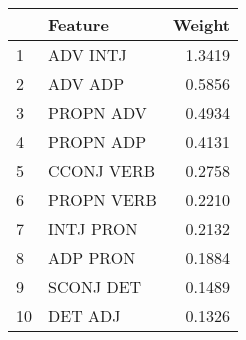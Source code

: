 \begin{tabular}{llr}
\toprule
{} &     Feature &  Weight \\
\midrule
1  &    ADV INTJ &  1.3419 \\
2  &     ADV ADP &  0.5856 \\
3  &   PROPN ADV &  0.4934 \\
4  &   PROPN ADP &  0.4131 \\
5  &  CCONJ VERB &  0.2758 \\
6  &  PROPN VERB &  0.2210 \\
7  &   INTJ PRON &  0.2132 \\
8  &    ADP PRON &  0.1884 \\
9  &   SCONJ DET &  0.1489 \\
10 &     DET ADJ &  0.1326 \\
\bottomrule
\end{tabular}
